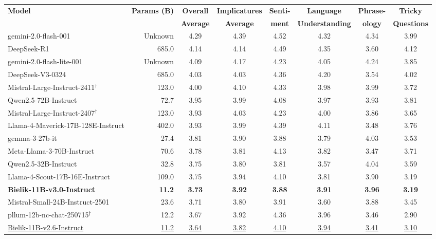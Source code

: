 \documentclass{article}
\begin{document}
\begin{table}[t]
    \centering
    \small
    \begin{tabular}{lrcccccc}
    \toprule
    \textbf{Model} & \textbf{Params (B)} & \textbf{Overall} & \textbf{Implicatures} & \textbf{Senti-} & \textbf{Language} & \textbf{Phrase-} & \textbf{Tricky} \\
    & & \textbf{Average} & \textbf{Average} & \textbf{ment} & \textbf{Understanding} & \textbf{ology} & \textbf{Questions} \\
    \midrule
    gemini-2.0-flash-001 & Unknown & 4.29 & 4.39 & 4.52 & 4.32 & 4.34 & 3.99 \\
    DeepSeek-R1 & 685.0 & 4.14 & 4.14 & 4.49 & 4.35 & 3.60 & 4.12 \\
    gemini-2.0-flash-lite-001 & Unknown & 4.09 & 4.17 & 4.23 & 4.05 & 4.24 & 3.85 \\
    DeepSeek-V3-0324 & 685.0 & 4.03 & 4.03 & 4.36 & 4.20 & 3.54 & 4.02 \\
    Mistral-Large-Instruct-2411$^{\dagger}$ & 123.0 & 4.00 & 4.10 & 4.33 & 3.98 & 3.99 & 3.72 \\
    Qwen2.5-72B-Instruct & 72.7 & 3.95 & 3.99 & 4.08 & 3.97 & 3.93 & 3.81 \\
    Mistral-Large-Instruct-2407$^{\dagger}$ & 123.0 & 3.93 & 4.03 & 4.23 & 4.00 & 3.86 & 3.65 \\
    Llama-4-Maverick-17B-128E-Instruct & 402.0 & 3.93 & 3.99 & 4.39 & 4.11 & 3.48 & 3.76 \\
    gemma-3-27b-it & 27.4 & 3.81 & 3.90 & 3.88 & 3.79 & 4.03 & 3.53 \\
    Meta-Llama-3-70B-Instruct & 70.6 & 3.78 & 3.81 & 4.13 & 3.82 & 3.47 & 3.71 \\
    Qwen2.5-32B-Instruct & 32.8 & 3.75 & 3.80 & 3.81 & 3.57 & 4.04 & 3.59 \\
    Llama-4-Scout-17B-16E-Instruct & 109.0 & 3.75 & 3.94 & 4.10 & 3.81 & 3.90 & 3.19 \\
    \textbf{Bielik-11B-v3.0-Instruct} & \textbf{11.2} & \textbf{3.73} & \textbf{3.92} & \textbf{3.88} & \textbf{3.91} & \textbf{3.96} & \textbf{3.19} \\
    Mistral-Small-24B-Instruct-2501 & 23.6 & 3.71 & 3.80 & 3.91 & 3.60 & 3.88 & 3.45 \\
    pllum-12b-nc-chat-250715$^{\dagger}$ & 12.2 & 3.67 & 3.92 & 4.36 & 3.96 & 3.46 & 2.90 \\
    \underline{Bielik-11B-v2.6-Instruct} & \underline{11.2} & \underline{3.64} & \underline{3.82} & \underline{4.10} & \underline{3.94} & \underline{3.41} & \underline{3.10} \\

\end{tabular}
\end{table}
\end{document}
